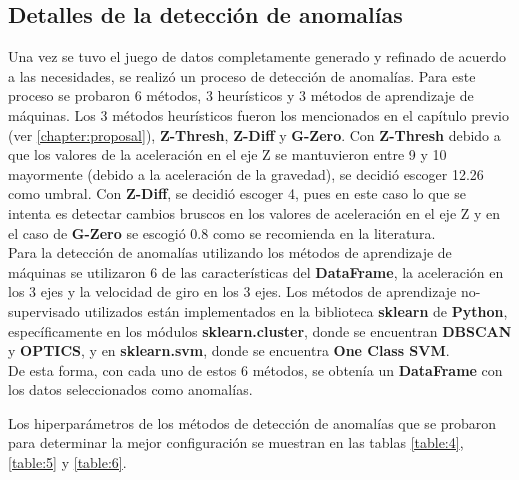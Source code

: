 	\subsection{Detalles de la detección de anomalías}
		Una vez se tuvo el juego de datos completamente generado y refinado de acuerdo a las necesidades, se realizó un proceso de detección de anomalías.
		Para este proceso se probaron 6 métodos, 3 heurísticos y 3 métodos de aprendizaje de máquinas. Los 3 métodos heurísticos fueron los mencionados 
		en el capítulo previo (ver \ref{chapter:proposal}), \textbf{Z-Thresh}, \textbf{Z-Diff} y \textbf{G-Zero}. Con \textbf{Z-Thresh} debido a que 
		los valores de la aceleración en el eje Z se mantuvieron entre 9 y 10 mayormente (debido a la aceleración de la gravedad), se decidió escoger
		12.26 como umbral. Con \textbf{Z-Diff}, se decidió escoger 4, pues en este caso lo que se intenta es detectar cambios bruscos en los valores de
		aceleración en el eje Z y en el caso de \textbf{G-Zero} se escogió 0.8 como se recomienda en la literatura.\\
		\indent Para la detección de anomalías utilizando los métodos de aprendizaje de máquinas se utilizaron 6 de las características del \textbf
		{DataFrame}, la aceleración en los 3 ejes y la velocidad de giro en los 3 ejes. Los métodos de aprendizaje no-supervisado utilizados están
		implementados en la biblioteca \textbf{sklearn} de \textbf{Python}, específicamente en los módulos \textbf{sklearn.cluster}, donde se encuentran
		\textbf{DBSCAN} y \textbf{OPTICS}, y en \textbf{sklearn.svm}, donde se encuentra \textbf{One Class SVM}.\\
		\indent De esta forma, con cada uno de estos 6 métodos, se obtenía un \textbf{DataFrame} con los datos seleccionados como anomalías.

		Los hiperparámetros de los métodos de detección de anomalías que se probaron para determinar la mejor configuración se muestran en las tablas 
		\ref{table:4}, \ref{table:5} y \ref{table:6}.

